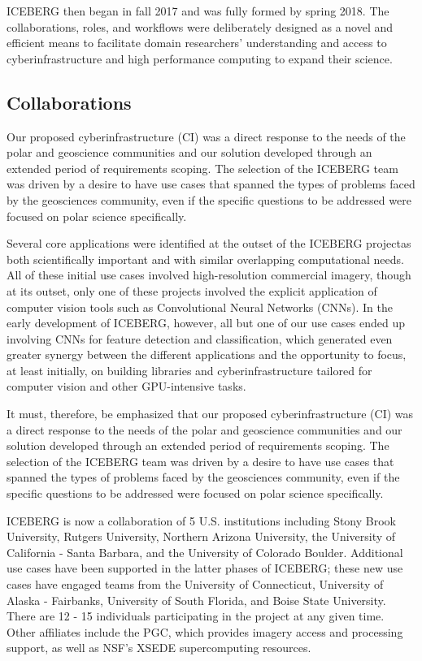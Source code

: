 \documentclass[manuscript,screen]{acmart}
\begin{document}
ICEBERG then began in fall 2017 and was fully formed by spring 2018.  The collaborations, roles, and workflows were deliberately designed as a novel and efficient means to facilitate domain researchers' understanding and access to cyberinfrastructure and high performance computing to expand their science. 

\subsection{Collaborations}
Our proposed cyberinfrastructure (CI) was a direct response to the needs of the polar and geoscience communities and our solution developed through an extended period of requirements scoping. The selection of the ICEBERG team was driven by a desire to have use cases that spanned the types of problems faced by the geosciences community, even if the specific questions to be addressed were focused on polar science specifically. 

Several core applications were identified at the outset of the ICEBERG projectas both scientifically important and with similar overlapping computational needs. All of these initial use cases involved high-resolution commercial imagery, though at its outset, only one of these projects involved the explicit application of computer vision tools such as Convolutional Neural Networks (CNNs). In the early development of ICEBERG, however, all but one of our use cases ended up involving CNNs for feature detection and classification, which generated even greater synergy between the different applications and the opportunity to focus, at least initially, on building libraries and cyberinfrastructure tailored for computer vision and other GPU-intensive tasks.

It must, therefore, be emphasized that our proposed cyberinfrastructure (CI) was a direct response to the needs of the polar and geoscience communities and our solution developed through an extended period of requirements scoping. The selection of the ICEBERG team was driven by a desire to have use cases that spanned the types of problems faced by the geosciences community, even if the specific questions to be addressed were focused on polar science specifically. 

ICEBERG is now a collaboration of 5 U.S. institutions including Stony Brook University, Rutgers University, Northern Arizona University, the University of California - Santa Barbara, and the University of Colorado Boulder.  Additional use cases have been supported in the latter phases of ICEBERG; these new use cases have engaged teams from the University of Connecticut, University of Alaska - Fairbanks, University of South Florida, and Boise State University.  There are 12 - 15 individuals participating in the project at any given time. Other affiliates include the PGC, which provides imagery access and processing support, as well as NSF’s XSEDE supercomputing resources. 
\end{document}
